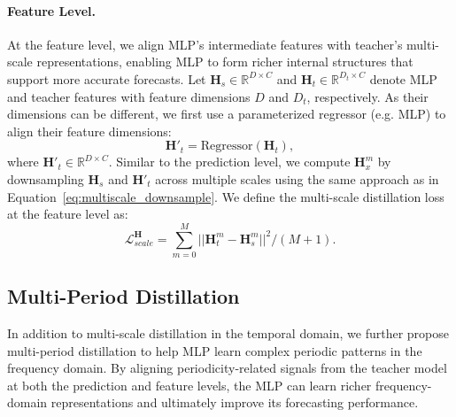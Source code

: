 \vspace{-0.5em}
\paragraph{Feature Level.} 
At the feature level, we align MLP’s intermediate features with teacher’s multi-scale representations, enabling MLP to form richer internal structures that support more accurate forecasts.
Let \(\mathbf{H}_s \in \mathbb{R}^{D \times C}\) and \(\mathbf{H}_t \in \mathbb{R}^{D_t \times C}\) denote MLP and teacher features with feature dimensions \(D\) and \(D_t\), respectively. As their dimensions can be different, we first use a parameterized regressor (e.g. MLP) to align their feature dimensions: 
\begin{equation}
    \mathbf{H}'_t = \text{Regressor}(\mathbf{H}_t),
\end{equation}
where \(\mathbf{H}'_t \in \mathbb{R}^{D \times C}\).  
Similar to the prediction level, we compute $\mathbf{H}_x^m$ by downsampling $\mathbf{H}_s$ and $\mathbf{H}'_t$ across multiple scales using the same approach as in Equation~\ref{eq:multiscale_downsample}. We define the multi-scale distillation loss at the feature level as:
\begin{equation}
    \mathcal{L}_{scale}^\mathbf{H} = \textstyle\sum_{m=0}^M ||\mathbf{H}_t^m - \mathbf{H}_s^m||^2 /(M+1).
\end{equation}

\subsection{Multi-Period Distillation}
{In addition to multi-scale distillation in the temporal domain, we further
propose multi-period distillation to help MLP learn complex periodic patterns in the frequency domain.} By aligning periodicity-related signals from the teacher model at both the prediction and feature levels, the MLP can learn richer frequency-domain representations and ultimately improve its forecasting performance.

